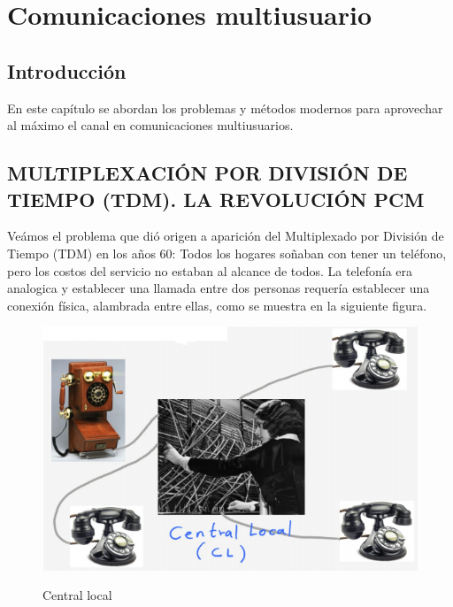 \chapter{Comunicaciones multiusuario}
\section{Introducción}
En este capítulo se abordan los problemas y métodos modernos para aprovechar al máximo el canal en comunicaciones multiusuarios.\\

\section{MULTIPLEXACIÓN POR DIVISIÓN DE TIEMPO (TDM). LA REVOLUCIÓN PCM }
Veámos  el problema que dió origen a  aparición del Multiplexado por División de Tiempo (TDM) en los años 60: Todos los hogares soñaban con tener un teléfono, pero los costos del servicio no estaban al alcance de todos. La telefonía era analogica y establecer una llamada entre dos personas requería establecer una conexión física, alambrada entre ellas, como se muestra en la siguiente figura. \\

\begin{figure}[h!]
	\captionsetup{justification = raggedright, singlelinecheck = false}
	\caption{Central local} 
	\centering
	\includegraphics[scale=0.8]{Imagenes/Central-local.png}
	\label{fig:Central}
\end{figure}

